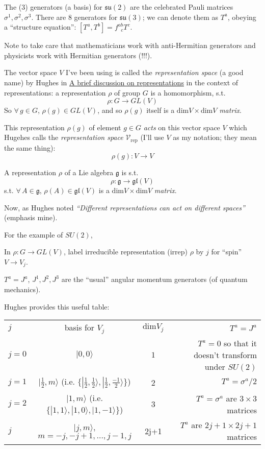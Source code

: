 \documentclass[10pt]{amsart}
\begin{document}
\begin{multicols}{2}
The (3) generators (a basis) for $\mathfrak{su}(2)$ are the celebrated Pauli matrices $\sigma^1, \sigma^2, \sigma^3$.  There are 8 generators for $\mathfrak{su}(3)$; we can denote them as $T^a$, obeying a ``structure equation'': $[T^a,T^b] = f^{ab}_{ \; \; c}T^c$.  

Note to take care that mathematicians work with anti-Hermitian generators and physicists work with Hermitian generators (!!!).  

The vector space $V$ I've been using is called the \emph{representation space} (a good name) by Hughes in \href{http://www.damtp.cam.ac.uk/user/ch558/pdf/Representations.pdf}{A brief discussion on representations} in the context of representations: a representation $\rho$ of group $G$ is a homomorphism, s.t.
\[
\rho : G \to GL(V)
\]
So $\forall \, g \in G$, $\rho(g) \in GL(V)$, and so $\rho(g)$ itself is a $\text{dim}V\times \text{dim}V$ \emph{matrix}.  

This representation $\rho(g)$ of element $g\in G$ \emph{acts} on this vector space $V$ which Hugehes calls the \emph{representation space} $\mathcal{V}_{\text{rep}}$ (I'll use $V$ as my notation; they mean the same thing):
\[
\rho(g) : V \to V
\]

A representation $\rho$ of a Lie algebra $\mathfrak{g}$ is s.t.
\[
\rho : \mathfrak{g} \to \mathfrak{gl}(V)
\]
s.t. $\forall \, A \in \mathfrak{g}$, $\rho(A) \in \mathfrak{gl}(V)$ is a $\text{dim}V \times \text{dim}V$ \emph{matrix}.  

Now, as Hughes noted \emph{``Different representations can act on different spaces''} (emphasis mine).  

For the example of $SU(2)$,

In $\rho :G\to GL(V)$, label irreducible representation (irrep) $\rho$ by $j$ for ``spin'' $V\to V_j$.  

$T^a = J^a$, $J^1, J^2,J^3$ are the ``usual'' angular momentum generators (of quantum mechanics).  

Hughes provides this useful table: 

\begin{tabular}{l | c | c | r }
$j$   & basis for $V_j$  &  $\text{dim}V_j$  & $T^a = J^a$  \\
$j=0$  & $ |0,0\rangle$   &  $1$              & $T^a =0$ so that it doesn't transform under $SU(2)$  \\
$j=1$  & $ |\frac{1}{2} , m \rangle$ (i.e. $\lbrace |\frac{1}{2}, \frac{1}{2} \rangle, |\frac{1}{2} , \frac{-1}{2} \rangle \rbrace$) & 2 & $T^a = \sigma^a /2$ \\ 
$j=2$  & $ |1 , m \rangle$ (i.e. $\lbrace | 1, 1 \rangle, | 1 , 0 \rangle , | 1,-1\rangle \rbrace$) & 3 & $T^a = \sigma^a $ are $3\times 3$ matrices \\ 
$j$  & $ |j , m \rangle$, $m=-j,-j+1,\dots , j-1, j$  & 2j+1 & $T^a$ are $2j+1 \times 2j+1$ matrices \\ 
\end{tabular}
  

\end{multicols}
\end{document}
